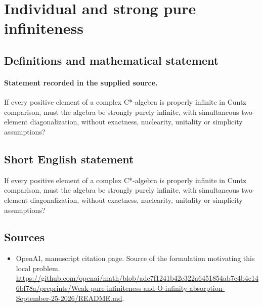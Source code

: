 \documentclass[11pt]{article}
\begin{document}
\section*{Individual and strong pure infiniteness}\label{statement}
\subsection{Definitions and mathematical statement}
\paragraph{Statement recorded in the supplied source.}
If every positive element of a complex C*-algebra is properly infinite in Cuntz comparison, must the algebra be strongly purely infinite, with simultaneous two-element diagonalization, without exactness, nuclearity, unitality or simplicity assumptions?
\subsection{Short English statement}
If every positive element of a complex C*-algebra is properly infinite in Cuntz comparison, must the algebra be strongly purely infinite, with simultaneous two-element diagonalization, without exactness, nuclearity, unitality or simplicity assumptions?
\subsection{Sources}
\begin{itemize}
\item[S1] OpenAI, manuscript citation page. Source of the formulation motivating this local problem.
\url{https://github.com/openai/math/blob/adc7f1241b42e322a6451854ab7e4b4c146bf78a/preprints/Weak-pure-infiniteness-and-O-infinity-absorption-September-25-2026/README.md}.
\end{itemize}
\end{document}

